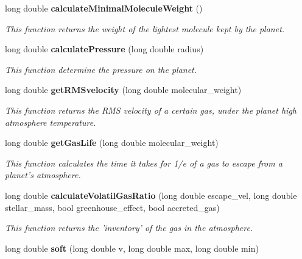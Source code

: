 \begin{CompactItemize}
long double {\bf calculate\-Minimal\-Molecule\-Weight} ()
\begin{CompactList}\small\item\em This function returns the weight of the lightest molecule kept by the planet. \item\end{CompactList}\item 
long double {\bf calculate\-Pressure} (long double radius)
\begin{CompactList}\small\item\em This function determine the pressure on the planet. \item\end{CompactList}\item 
long double {\bf get\-RMSvelocity} (long double molecular\_\-weight)
\begin{CompactList}\small\item\em This function returns the RMS velocity of a certain gas, under the planet high atmosphere temperature. \item\end{CompactList}\item 
long double {\bf get\-Gas\-Life} (long double molecular\_\-weight)
\begin{CompactList}\small\item\em This function calculates the time it takes for 1/e of a gas to escape from a planet's atmosphere. \item\end{CompactList}\item 
long double {\bf calculate\-Volatil\-Gas\-Ratio} (long double escape\_\-vel, long double stellar\_\-mass, bool greenhouse\_\-effect, bool accreted\_\-gas)
\begin{CompactList}\small\item\em This function returns the 'inventory' of the gas in the atmosphere. \item\end{CompactList}\item 
long double {\bf soft} (long double v, long double max, long double min)\label{class_s_g___planet_b32}


\end{CompactItemize}

